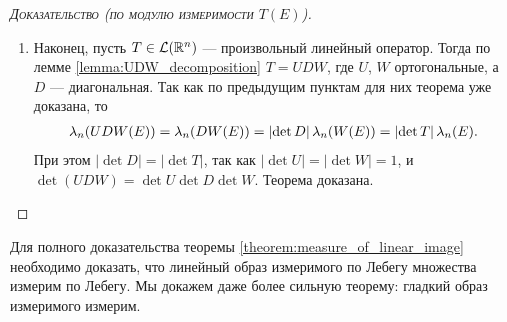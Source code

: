 \begin{proof}[\normalfont\textsc{Доказательство (по модулю измеримости $T(E)$)}]
\begin{enumerate}
\begin{enumerate}
     \begin{align*}
      D(\left[0, 1\right)^{n}) = \left[0, d_1\right) \times \ldots \times \left[0, d_n\right)
     ,\end{align*} причём если $d_i < 0$, то за  $\left[0, d_i\right)$  мы понимаем $\left(d_i, 0\right]$. Тогда мера равна
     \begin{align*}
      \mu(\left[0, 1\right)^{n}) = \lan(D(\left[0, 1\right)^{n})) = \left| d_1 \right| \cdot \ldots \cdot \left| d_n \right| = \left| \det D \right|
     .\end{align*}  Следовательно, $a = \left| \det D \right|$.
   \end{enumerate}
  \item Наконец, пусть $T \in \mathcal{L}(\mathbb{R}^{n})$ --- произвольный линейный оператор. Тогда по лемме \ref{lemma:UDW_decomposition} $T = UDW$, где $U$, $W$ ортогональные, а $D$ --- диагональная. Так как по предыдущим пунктам для них теорема уже доказана, то
   \begin{align*}
    \lambda_n(UDW(E)) = \lambda_n(DW(E)) = \left| \det D \right| \lambda_n(W(E)) = \left| \det T \right| \lambda_n(E)
   .\end{align*} При этом $\left| \det D \right| = \left| \det T \right|$, так как $\left| \det U \right| = \left| \det W \right| = 1 $, и $\det (UDW) = \det U \det D \det W$. Теорема доказана.
 \end{enumerate}
\end{proof}

Для полного доказательства теоремы \ref{theorem:measure_of_linear_image} необходимо доказать, что линейный образ измеримого по Лебегу множества измерим по Лебегу. Мы докажем даже более сильную теорему: гладкий образ измеримого измерим.

